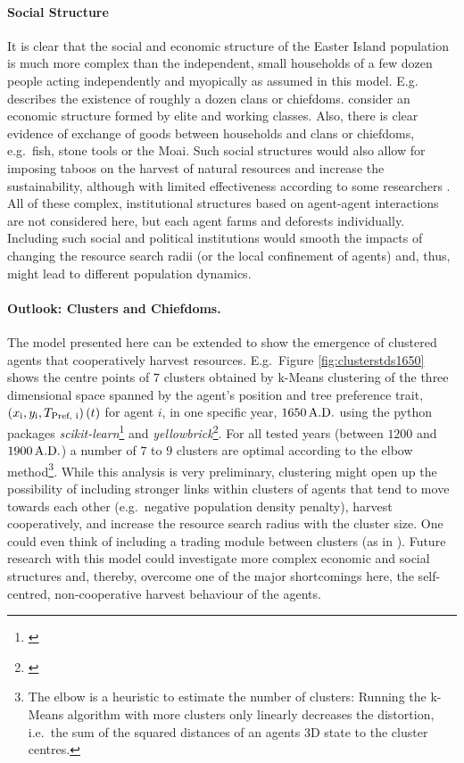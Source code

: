 \paragraph{Social Structure}
It is clear that the social and economic structure of the Easter Island population is much more complex than the independent, small households of a few dozen people acting independently and myopically as assumed in this model. 
E.g.\ \citet{Diamond2011} describes the existence of roughly a dozen clans or chiefdoms. \citet{Puleston2017} consider an economic structure formed by elite and working classes.
Also, there is clear evidence of exchange of goods between households and clans or chiefdoms, e.g.\ fish, stone tools or the Moai.
Such social structures would also allow for imposing taboos on the harvest of natural resources and increase the sustainability, although with limited effectiveness according to some researchers \citep{Good2006}. 
All of these complex, institutional structures based on agent-agent interactions are not considered here, but each agent farms and deforests individually.
Including such social and political institutions would smooth the impacts of changing the resource search radii (or the local confinement of agents) and, thus, might lead to different population dynamics.

\paragraph{Outlook: Clusters and Chiefdoms.}
The model presented here can be extended to show the emergence of clustered agents that cooperatively harvest resources.
E.g.\ Figure \ref{fig:clusterstds1650} shows the centre points of $7$ clusters obtained by k-Means clustering of the three dimensional space spanned by the agent's position and tree preference trait, $\left( x_{\rm i}, y_{\rm i}, T_\text{Pref, i} \right)(t)$ for agent $i$, in one specific year, $1650\, {\rm A.D.}$ using the python packages \textit{scikit-learn}\footnote{\citet{scikit-learn}} and \textit{yellowbrick}\footnote{\citet{yellowbrick}}.
For all tested years (between $1200$ and $1900\, {\rm A.D.}$) a number of $7$ to $9$ clusters are optimal according to the elbow method\footnote{The elbow is a heuristic to estimate the number of clusters:
	Running the k-Means algorithm with more clusters only linearly decreases the distortion, i.e.\ the sum of the squared distances of an agents 3D state to the cluster centres.}.
While this analysis is very preliminary, clustering might open up the possibility of including stronger links within clusters of agents that tend to move towards each other (e.g.\ negative population density penalty), harvest cooperatively, and increase the resource search radius with the cluster size.
One could even think of including a trading module between clusters (as in ).
Future research with this model could investigate more complex economic and social structures and, thereby, overcome one of the major shortcomings here, the self-centred, non-cooperative harvest behaviour of the agents.

